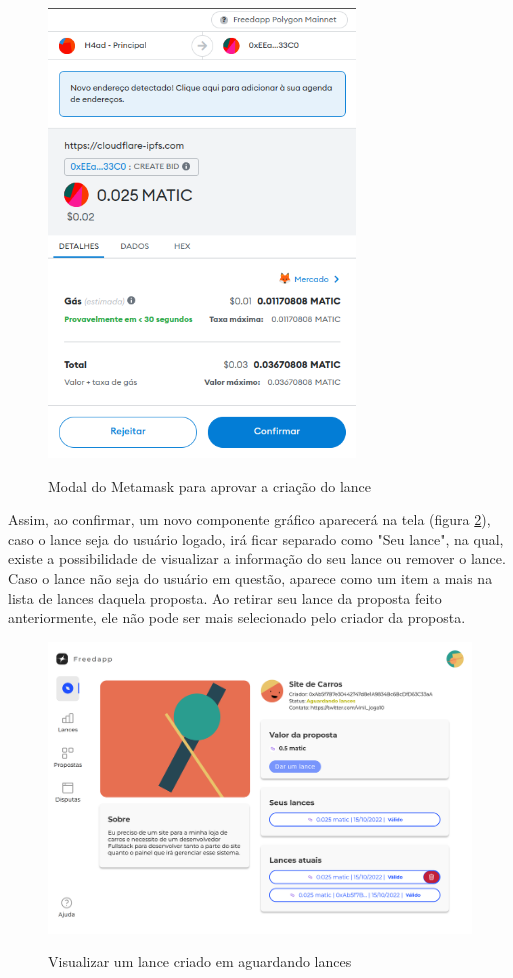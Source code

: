 \clearpage

\begin{figure}[!h]
  \centering
  \caption{Modal do Metamask para aprovar a criação do lance}
  \includegraphics[height=450px]{src/images/app/create_bid_modal_approval.png}
  \label{fig:create_bid_modal_approval_fig}
\end{figure}

Assim, ao confirmar, um novo componente gráfico aparecerá na tela (figura \ref{fig:proposal_detail_see_bid_fig}), caso o lance seja do usuário logado, irá ficar separado como "Seu lance", na qual, existe a possibilidade de visualizar a informação do seu lance ou remover o lance. Caso o lance não seja do usuário em questão, aparece como um item a mais na lista de lances daquela proposta. Ao retirar seu lance da proposta feito anteriormente, ele não pode ser mais selecionado pelo criador da proposta.

\clearpage

\begin{figure}[!h]
  \centering
  \caption{Visualizar um lance criado em aguardando lances}
  \includegraphics[width=450px]{src/images/app/proposal_detail_see_bid.png}
  \label{fig:proposal_detail_see_bid_fig}
\end{figure}


